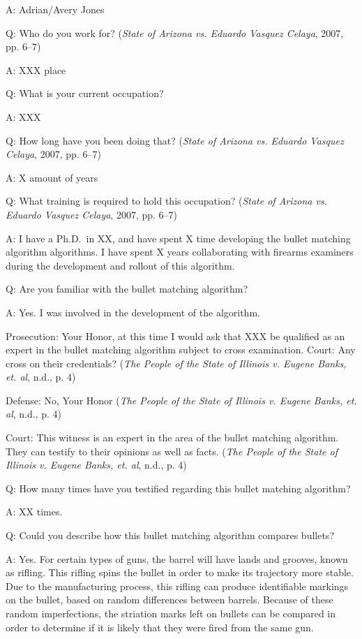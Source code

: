 \documentclass[print]{nuthesis}
\begin{document}
A: Adrian/Avery Jones

Q: Who do you work for? (\emph{State of {Arizona} vs. Eduardo {Vasquez} {Celaya}}, 2007, pp. 6--7)

A: XXX place

Q: What is your current occupation?

A: XXX

Q: How long have you been doing that? (\emph{State of {Arizona} vs. Eduardo {Vasquez} {Celaya}}, 2007, pp. 6--7)

A: X amount of years

Q: What training is required to hold this occupation? (\emph{State of {Arizona} vs. Eduardo {Vasquez} {Celaya}}, 2007, pp. 6--7)

A: I have a Ph.D.~in XX, and have spent X time developing the bullet matching algorithm algorithms.
I have spent X years collaborating with firearms examiners during the development and rollout of this algorithm.

Q: Are you familiar with the bullet matching algorithm?

A: Yes. I was involved in the development of the algorithm.

Prosecution: Your Honor, at this time I would ask that XXX be qualified as an expert in the bullet matching algorithm subject to cross examination.
Court: Any cross on their credentials? (\emph{The {People} of the {State} of {Illinois} v. Eugene {Banks}, et. al}, n.d., p. 4)

Defense: No, Your Honor (\emph{The {People} of the {State} of {Illinois} v. Eugene {Banks}, et. al}, n.d., p. 4)

Court: This witness is an expert in the area of the bullet matching algorithm. They can testify to their opinions as well as facts. (\emph{The {People} of the {State} of {Illinois} v. Eugene {Banks}, et. al}, n.d., p. 4)

Q: How many times have you testified regarding this bullet matching algorithm?

A: XX times.

Q: Could you describe how this bullet matching algorithm compares bullets?

A: Yes. For certain types of guns, the barrel will have lands and grooves, known as rifling.
This rifling spins the bullet in order to make its trajectory more stable. Due to the manufacturing process, this rifling can produce identifiable markings on the bullet, based on random differences between barrels.
Because of these random imperfections, the striation marks left on bullets can be compared in order to determine if it is likely that they were fired from the same gun.
\end{document}
